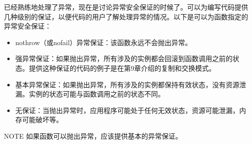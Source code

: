 已经熟练地处理了异常，现在是讨论异常安全保证的时候了。可以为编写代码提供几种级别的保证，以便代码的用户了解处理异常的情况。以下是可以为函数指定的异常安全保证：

\begin{itemize}
\item
nothrow（或nofail）异常保证：该函数永远不会抛出异常。

\item
强异常保证：如果抛出异常，所有涉及的实例都会回滚到函数调用之前的状态。提供这种保证的代码的例子是在第9章介绍的复制和交换模式。

\item
基本异常保证：如果抛出异常，所有涉及的实例都保持有效状态，没有资源泄漏。实例的状态可能与函数调用之前的状态不同。

\item
无保证：当抛出异常时，应用程序可能处于任何无效状态，资源可能泄漏，内存可能破坏等。
\end{itemize}

\begin{myNotic}{NOTE}
如果函数可以抛出异常，应该提供基本的异常保证。
\end{myNotic}